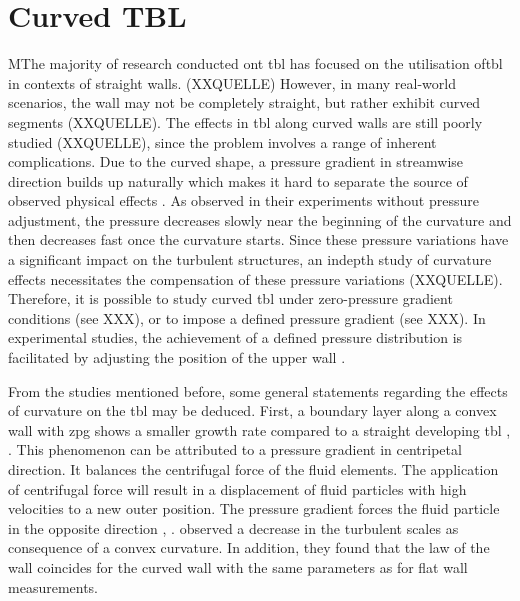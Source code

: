 \section{Curved TBL}

MThe majority of research conducted ont \acrshort{tbl} has focused on  the utilisation of\acrshort{tbl}  in contexts of straight walls. (XXQUELLE)
However, in many real-world scenarios, the wall may not be completely straight, but rather exhibit curved segments (XXQUELLE). 
The effects in \acrshort{tbl} along curved walls are still poorly studied (XXQUELLE), since the problem involves a range of inherent complications. 
Due to the curved shape, a pressure gradient in streamwise direction builds up naturally which makes it hard to separate the source of observed physical effects \citep{so_experimental_nodate}. 
As \citet{so_experiment_1973} observed in their experiments without pressure adjustment, the pressure decreases slowly near the beginning of the curvature and then decreases fast once the curvature starts. 
Since these pressure variations have a significant impact on the turbulent structures, an indepth study of curvature effects necessitates the  compensation of these pressure variations (XXQUELLE). 
Therefore, it is possible to study curved \acrshort{tbl} under zero-pressure gradient conditions (see XXX), or to impose a defined pressure gradient (see XXX). 
In experimental studies, the achievement of a defined pressure distribution is facilitated by adjusting the position of the upper wall
 \citep{so_experimental_nodate, johnston_experimental_nodate, gillis_turbulent_1983,schwarz_convex_1996}. 

From the  studies mentioned before, some general statements regarding the effects of curvature on the \acrshort{tbl} may be  deduced.
First, a boundary layer along a convex wall with \acr  \acrshort{zpg} shows a smaller growth rate compared to a straight developing \acrfull{tbl} \citep{so_experimental_nodate}, \citep{meroney_turbulent_1975}. 
This phenomenon can be attributed to a pressure gradient in  centripetal direction. 
It balances the centrifugal force of the fluid elements. The application of  centrifugal force  will result  in   a displacement of fluid particles with high velocities  to a new outer position. 
The pressure gradient forces the fluid particle in the opposite direction \citep{so_experimental_nodate}, \citep{meroney_turbulent_1975}.
\citet{gillis_turbulent_1983} observed a decrease in the turbulent scales as consequence of a convex curvature. 
In addition, they found that the law of the wall coincides for the curved wall with the same parameters as for flat wall measurements. 

